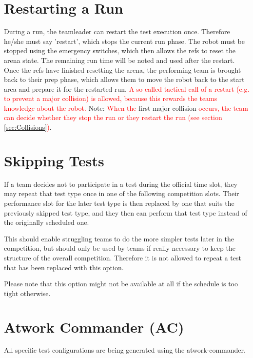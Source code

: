 \section{Restarting a Run}

During a run, the teamleader can restart the test execution once.
Therefore he/she must say 'restart', which stops the current run phase. The robot must be stopped using the emergency switches, which then allows the refs to reset the arena state.
The remaining run time will be noted and used after the restart. Once the refs have finished resetting the arena, the performing team is brought back to their prep phase, which allows them to move the robot back to the start area and prepare it for the restarted run.
\textcolor{red}{A so called tactical call of a restart (e.g. to prevent a major collision) is allowed, because this rewards the teams knowledge about the robot.}
Note: \textcolor{red}{When the} first major collision \textcolor{red}{occurs, the team can decide whether they stop the run or they restart the run (see section \ref{sec:Collisions})}.


\section{Skipping Tests}

If a team decides not to participate in a test during the official time slot, 
they may repeat that test type once in one of the following competition slots.
Their performance slot for the later test type is then replaced by one that suits the previously skipped test type, and they then can perform that test type instead of the originally scheduled one.

This should enable struggling teams to do the more simpler tests later in the competition,
but should only be used by teams if really necessary to keep the structure of the overall competition. 
Therefore it is not allowed to repeat a test that has been replaced with this option.

Please note that this option might not be available at all if the schedule is too tight otherwise.

\section{Atwork Commander (AC)}
\label{sec:atwork-commander}

All specific test configurations are being generated using the atwork-commander.

